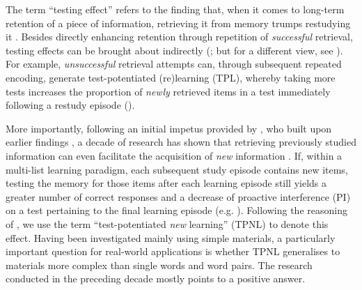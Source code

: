 \documentclass[../main.tex]{subfiles}
\begin{document}
The term ``testing effect'' refers to the finding that, when it comes to 
long-term retention of a piece of information, retrieving it from memory 
trumps restudying it  
\citep{karpickeCriticalImportanceRetrieval2008,roedigeriiiPowerTestingMemory2006,
 roedigeriiiTestEnhancedLearningTaking2006, rowlandEffectTestingRestudy2014, 
adesopeRethinkingUseTests2017, roedigeriiiCriticalRoleRetrieval2011, 
gloverTestingPhenomenonNot1989}. Besides directly enhancing retention 
through repetition of \textit{successful} retrieval, testing effects can be 
brought about indirectly 
(\citealp{arnoldTestpotentiatedLearningDistinguishing2013, 
roedigeriiiPowerTestingMemory2006}; but for a different view, see 
\citealp{kornellRetrievalAttemptsEnhance2015}). For example, 
\textit{unsuccessful} retrieval attempts can, through subsequent repeated 
encoding, generate test-potentiated (re)learning (TPL), whereby taking more 
tests increases the proportion of \textit{newly} retrieved items in a test 
immediately following a restudy episode 
(\citealp{izawaReinforcementTestSequencesPairedAssociate1966,izawaOptimalPotentiatingEffects1970,
 kornellUnsuccessfulRetrievalAttempts2009, arnoldFreeRecallEnhances2013, 
arnoldTestpotentiatedLearningDistinguishing2013, 
wissmanTestpotentiatedLearningThree2018}).

More importantly, following an initial impetus provided by 
\cite{szpunarTestingStudyInsulates2008}, who built upon earlier findings 
\citep{darleyEffectsPriorFree1971, tulvingNegativeTransferEffects1974}, a 
decade of research has shown that 
retrieving previously studied information 
can even facilitate the acquisition of \textit{new} information 
\citep{chanRetrievalPotentiatesNew2018, 
	pastotterRetrievalPracticeEnhances2014, 
	yangEnhancingLearningRetrieval2018}. If, within a multi-list learning
paradigm, each subsequent study episode contains new items, testing the 
memory for those items after each learning episode still yields a greater 
number of correct responses and a decrease of proactive interference (PI) on 
a test pertaining to the final learning episode (e.g. 
\citealp{szpunarInterpolatedMemoryTests2013, 
szpunarTestingStudyInsulates2008, wissmanInterimTestEffect2011}). Following 
the reasoning of \cite{chanRetrievalPotentiatesNew2018}, we use the term 
``test-potentiated \textit{new} learning'' (TPNL) to denote this effect.
Having been investigated mainly using simple materials, a particularly 
important question for real-world applications is whether TPNL generalises 
to materials more complex than single words and word pairs. The research 
conducted in the preceding decade mostly points to a positive answer.
\end{document}
